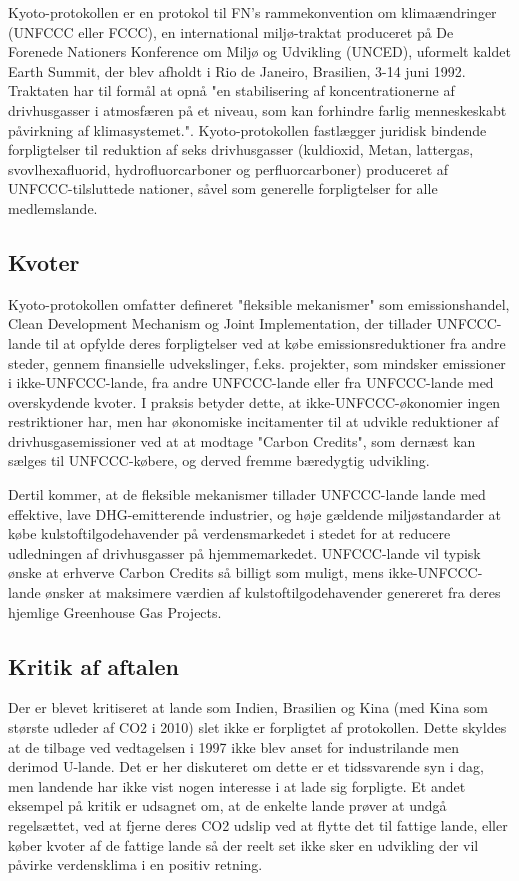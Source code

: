 Kyoto-protokollen er en protokol til FN's rammekonvention om klimaændringer (UNFCCC eller FCCC), en international miljø-traktat produceret på De Forenede Nationers Konference om Miljø og Udvikling (UNCED), uformelt kaldet Earth Summit, der blev afholdt i Rio de Janeiro, Brasilien, 3-14 juni 1992. Traktaten har til formål at opnå "en stabilisering af koncentrationerne af drivhusgasser i atmosfæren på et niveau, som kan forhindre farlig menneskeskabt påvirkning af klimasystemet.". Kyoto-protokollen fastlægger juridisk bindende forpligtelser til reduktion af seks drivhusgasser (kuldioxid, Metan, lattergas, svovlhexafluorid, hydrofluorcarboner og perfluorcarboner) produceret af UNFCCC-tilsluttede nationer, såvel som generelle forpligtelser for alle medlemslande.

\subsection{Kvoter}

Kyoto-protokollen omfatter defineret "fleksible mekanismer" som emissionshandel, Clean Development Mechanism og Joint Implementation, der tillader UNFCCC-lande til at opfylde deres forpligtelser ved at købe emissionsreduktioner fra andre steder, gennem finansielle udvekslinger, f.eks. projekter, som mindsker emissioner i ikke-UNFCCC-lande, fra andre UNFCCC-lande eller fra UNFCCC-lande med overskydende kvoter. I praksis betyder dette, at ikke-UNFCCC-økonomier ingen restriktioner har, men har økonomiske incitamenter til at udvikle reduktioner af drivhusgasemissioner ved at at modtage "Carbon Credits", som dernæst kan sælges til UNFCCC-købere, og derved fremme bæredygtig udvikling.

Dertil kommer, at de fleksible mekanismer tillader UNFCCC-lande lande med effektive, lave DHG-emitterende industrier, og høje gældende miljøstandarder at købe kulstoftilgodehavender på verdensmarkedet i stedet for at reducere udledningen af drivhusgasser på hjemmemarkedet. UNFCCC-lande vil typisk ønske at erhverve Carbon Credits så billigt som muligt, mens ikke-UNFCCC-lande ønsker at maksimere værdien af kulstoftilgodehavender genereret fra deres hjemlige Greenhouse Gas Projects.

\subsection{Kritik af aftalen}

Der er blevet kritiseret at lande som Indien, Brasilien og Kina (med Kina som største udleder af CO2 i 2010) slet ikke er forpligtet af protokollen. Dette skyldes at de tilbage ved vedtagelsen i 1997 ikke blev anset for industrilande men derimod U-lande. Det er her diskuteret om dette er et tidssvarende syn i dag, men landende har ikke vist nogen interesse i at lade sig forpligte. Et andet eksempel på kritik er udsagnet om, at de enkelte lande prøver at undgå regelsættet, ved at fjerne deres CO2 udslip ved at flytte det til fattige lande, eller køber kvoter af de fattige lande så der reelt set ikke sker en udvikling der vil påvirke verdensklima i en positiv retning.

